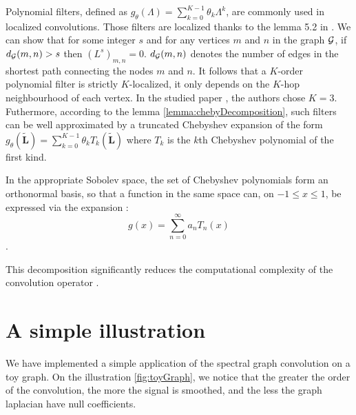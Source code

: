 \documentclass[sigconf]{acmart}
\begin{document}
Polynomial filters, defined as $g_\theta(\Lambda) = \sum_{k=0}^{K-1}\theta_k\Lambda^k$, are commonly used in localized convolutions. Those filters are localized thanks to the lemma 5.2 in \cite{hammond_wavelets_2011}. We can show that for some integer $s$ and for any 
vertices $m$ and $n$ in the graph $\mathcal{G}$, if $d_{\mathcal{G}}(m, n) > s$ then $(L^s)_{m, n} = 0$. $d_{\mathcal{G}}(m, n)$ denotes the number of edges in the shortest path connecting the nodes $m$ and $n$.
It follows that a $K$-order polynomial filter is strictly $K$-localized, \ie it only depends on the $K$-hop neighbourhood of each vertex. In the studied paper \cite{Parisot17}, the authors chose $K=3$.\\ 
Futhermore, according to the lemma \ref{lemma:chebyDecomposition}, such filters can be well approximated by a truncated Chebyshev expansion of the form $g_\theta(\widetilde{\mathbf{L}}) = \sum_{k=0}^{K-1}\theta_kT_k(\widetilde{\mathbf{L}})$ where $T_k$ is the $k$th Chebyshev polynomial of the first kind.
\begin{lemma}\label{lemma:chebyDecomposition}
    In the appropriate Sobolev space, the set of Chebyshev polynomials form an orthonormal basis, so that a function in the same space can, on $-1\leq x \leq 1$, be expressed via the expansion : $$g(x) = \sum_{n=0}^{\infty} a_nT_n(x)$$.
\end{lemma}
This decomposition significantly reduces the computational complexity of the convolution operator \cite{Parisot17}.


\section{A simple illustration}

We have implemented a simple application of the spectral graph convolution on a toy graph. 
On the illustration \ref{fig:toyGraph}, we notice that the greater the order of the convolution,  the more the signal is smoothed, and the less the graph laplacian have null coefficients.
\end{document}
